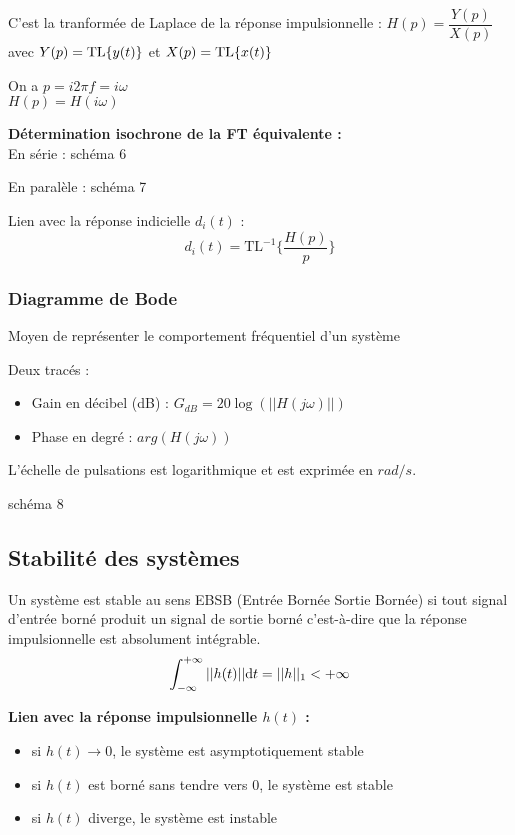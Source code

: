 \documentclass[a4paper,12pt]{article}
\begin{document}
C'est la tranformée de Laplace de la réponse impulsionnelle :
$H(p) = \dfrac{Y(p)}{X(p)}$ avec $Y(p) = \mathrm{TL} \{ y(t) \}$ et $X(p) = \mathrm{TL} \{ x(t) \}$

On a $p = i2\pi f = i\omega$ \\
$H(p) = H(i\omega)$

\textbf{Détermination isochrone de la FT équivalente :} \\

En série :
{\Large schéma 6}

En paralèle :
{\Large schéma 7}

Lien avec la réponse indicielle $d_i(t)$ :
\[ d_i(t) = \mathrm{TL}^{-1}\{ \frac{H(p)}{p} \} \]

\subsubsection{Diagramme de Bode}

Moyen de représenter le comportement fréquentiel d'un système

Deux tracés :

\begin{itemize}
    \item Gain en décibel (dB) : $G_{dB} = 20 \log (|| H(j\omega) ||)$
    \item Phase en degré : $arg(H(j\omega))$
\end{itemize}

L'échelle de pulsations est logarithmique et est exprimée en $rad/s$.

{\Large schéma 8}

\subsection{Stabilité des systèmes}

Un système est stable au sens EBSB (Entrée Bornée Sortie Bornée) si tout signal d'entrée borné produit un signal de sortie borné c'est-à-dire que la réponse impulsionnelle est absolument intégrable.
\[ \int_{-\infty}^{+\infty} ||h(t)|| \mathrm{d}t = ||h||_1 < +\infty \]

\textbf{Lien avec la réponse impulsionnelle $h(t)$ :}

\begin{itemize}
    \item si $h(t) \to 0$, le système est asymptotiquement stable
    \item si $h(t)$ est borné sans tendre vers $0$, le système est stable
    \item si $h(t)$ diverge, le système est instable
\end{itemize}
\end{document}
